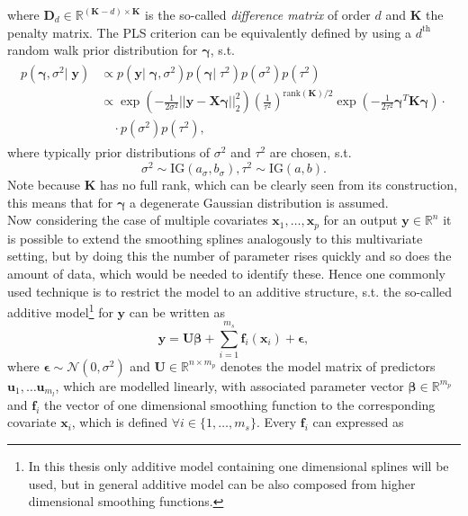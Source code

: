 \documentclass[12pt,letterpaper]{article}
\numberwithin{equation}{subsection}
\begin{document}
where $\mathbf{D}_d \in \mathbb{R}^{(\mathbf{K}-d) \times \mathbf{K}}$ is the so-called \textit{difference matrix} of order $d$ and $\mathbf{K}$ the penalty matrix. The PLS criterion can be equivalently defined by using a $d^{\text{th}}$ random walk prior distribution for $\mathbf{\gamma}$, s.t. 
\begin{align}
\begin{split}
p(\mathbf{\gamma}, \sigma^2 | \; \mathbf{y}) & \propto  p(\mathbf{y} | \; \mathbf{\gamma}, \sigma^2) p(\mathbf{\gamma} | \; \tau^2) p(\sigma^2) p(\tau^2) \\
& \propto  \exp(-\frac{1}{2\sigma^2}||\mathbf{y} - \mathbf{X}\mathbf{\gamma}||^2_2)
(\frac{1}{\tau^2})^{\text{rank}(\mathbf{K})/2}\exp(-\frac{1}{2\tau^2}\mathbf{\gamma}^T\mathbf{K}\mathbf{\gamma}) \cdot \\
 &  \quad\cdot p(\sigma^2) p(\tau^2),
\end{split}
\end{align}
where typically prior distributions of $\sigma^2$ and $\tau^2$ are chosen, s.t. 
\begin{equation}
\sigma^2 \sim \text{IG}(a_\sigma, b_\sigma), \tau^2 \sim \text{IG}(a, b).
\end{equation}
Note because $\mathbf{K}$ has no full rank, which can be clearly seen from its construction, this means that for $\mathbf{\gamma}$ a degenerate Gaussian distribution is assumed. \\
Now considering the case of multiple covariates $\mathbf{x}_1, \dots , \mathbf{x}_p$ for an output $\mathbf{y} \in \mathbb{R}^n$ it is possible to extend the smoothing splines analogously to this multivariate setting, but by doing this the number of parameter rises quickly and so does the amount of data, which would be needed to identify these. Hence one commonly used technique is to restrict the model to an additive structure, s.t. the so-called additive model\footnote{In this thesis only additive model containing one dimensional splines will be used, but in general additive model can be also composed from higher dimensional smoothing functions.} for $\mathbf{y}$ can be written as
\begin{equation}
\mathbf{y} = \mathbf{U}\mathbf{\beta} +  \sum^{m_s}_{i=1} \mathbf{f}_i(\mathbf{x}_i) + \mathbf{\epsilon},
\label{eq:am}
\end{equation}
where $\mathbf{\epsilon} \sim \mathcal{N}(0, \sigma^2)$ and $\mathbf{U}\in \mathbb{R}^{n\times m_{p}} $ denotes the model matrix of predictors $\mathbf{u}_1,\dots\mathbf{u}_{m_l}$, which are modelled linearly, with associated parameter vector $\mathbf{\beta} \in \mathbb{R}^{ m_{p}}$ and $\mathbf{f}_i$ the vector of one dimensional smoothing function to the corresponding covariate $\mathbf{x}_i$, which is defined $\forall i \in \{1,\dots ,m_{s}\}$. Every $\mathbf{f}_i$ can expressed as 
\end{document}
